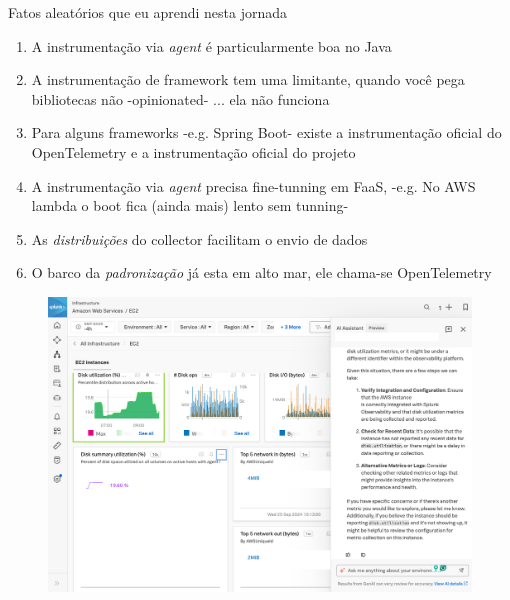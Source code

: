 \documentclass[aspectratio=169]{beamer}
\begin{document}
	
	\begin{frame}{Fatos aleatórios que eu aprendi nesta jornada}
		
		
		\begin{enumerate}
			\item A instrumentação via \textit{agent} é particularmente boa no Java
			\item A instrumentação de framework tem uma limitante, quando você pega bibliotecas não -opinionated- ... ela não funciona
			\item Para alguns frameworks -e.g. Spring Boot- existe a instrumentação oficial do OpenTelemetry e a instrumentação oficial do projeto
			\item A instrumentação via \textit{agent} precisa fine-tunning em FaaS,  -e.g. No AWS lambda o boot fica (ainda mais) lento sem tunning-
			\item As \textit{distribuições} do collector facilitam o envio de dados
			\item O barco da \textit{padronização} já esta em alto mar, ele chama-se OpenTelemetry
			\end{enumerate}
	\end{frame}
	
	\begin{frame}
		\begin{figure}
			\centering
			\includegraphics[width=\linewidth]{Images/aiops}
			\label{fig:aiops}
		\end{figure}
	\end{frame}
	
\end{document}
